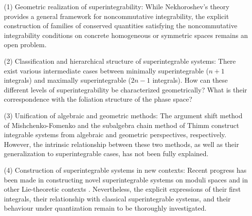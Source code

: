 \documentclass[11pt,reqno]{amsart}
\newtheorem*{theorem A}{Main Theorem A}
\newtheorem*{theorem B}{Main Theorem B}
\newtheorem*{theorem C}{Main Theorem C}
\newtheorem*{theorem D}{Main Theorem D}
\theoremstyle{definition}
\theoremstyle{plain}
\theoremstyle{conclusion}
\begin{document}
(1) Geometric realization of superintegrability: While Nekhoroshev's theory provides a general framework for noncommutative integrability, the explicit construction of families of conserved quantities satisfying the noncommutative integrability conditions on concrete homogeneous or symmetric spaces remains an open problem.

(2) Classification and hierarchical structure of superintegrable systems: There exist various intermediate cases between minimally superintegrable ($n+1$ integrals) and maximally superintegrable ($2n-1$ integrals). How can these different levels of superintegrability be characterized geometrically? What is their correspondence with the foliation structure of the phase space?

(3) Unification of algebraic and geometric methods: The argument shift method of Mishchenko-Fomenko and the subalgebra chain method of Thimm construct integrable systems from algebraic and geometric perspectives, respectively. However, the intrinsic relationship between these two methods, as well as their generalization to superintegrable cases, has not been fully explained.

(4) Construction of superintegrable systems in new contexts: Recent progress has been made in constructing novel superintegrable systems on moduli spaces and in other Lie-theoretic contexts \cite{MR4299124}. Nevertheless, the explicit expressions of their first integrals, their relationship with classical superintegrable systems, and their behaviour under quantization remain to be thoroughly investigated.
\end{document}
